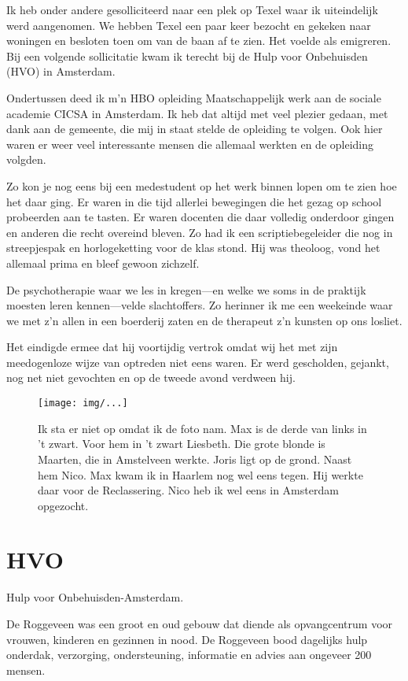 \documentclass[10pt,twoside,openright]{memoir}
\begin{document}
Ik heb onder andere gesolliciteerd naar een plek op Texel waar ik uiteindelijk werd aangenomen. We hebben Texel een paar keer bezocht en gekeken naar woningen en besloten toen om van de baan af te zien. Het voelde als emigreren. Bij een volgende sollicitatie kwam ik terecht bij de Hulp voor Onbehuisden (HVO) in Amsterdam.

Ondertussen deed ik m’n HBO opleiding Maatschappelijk werk aan de sociale academie CICSA in Amsterdam. Ik heb dat altijd met veel plezier gedaan, met dank aan de gemeente, die mij in staat stelde de opleiding te volgen. Ook hier waren er weer veel interessante mensen die allemaal werkten en de opleiding volgden. 

Zo kon je nog eens bij een medestudent op het werk binnen lopen om te zien hoe het daar ging. Er waren in die tijd allerlei bewegingen die het gezag op school probeerden aan te tasten. Er waren docenten die daar volledig onderdoor gingen en anderen die recht overeind bleven. Zo had ik een scriptiebegeleider die nog in streepjespak en horlogeketting voor de klas stond. Hij was theoloog, vond het allemaal prima en bleef gewoon zichzelf. 

De psychotherapie waar we les in kregen---en welke we soms in de praktijk moesten leren kennen---velde slachtoffers. Zo herinner ik me een weekeinde waar we met z’n allen in een boerderij zaten en de therapeut z’n kunsten op ons losliet. 

Het eindigde ermee dat hij voortijdig vertrok omdat wij het met zijn meedogenloze wijze van optreden niet eens waren. Er werd gescholden, gejankt, nog net niet gevochten en op de tweede avond verdween hij.

\begin{figure}[t]
\texttt{[image: img/...]}
\caption{Ik sta er niet op omdat ik de foto nam. Max is de derde van links in ’t zwart. Voor hem in ’t zwart Liesbeth. Die grote blonde is Maarten, die in Amstelveen werkte. Joris ligt op de grond. Naast hem Nico. Max kwam ik in Haarlem nog wel eens tegen. Hij werkte daar voor de Reclassering. Nico heb ik wel eens in Amsterdam opgezocht.}
\end{figure}

\chapter{HVO} %
\label{cha:hvo}

Hulp voor Onbehuisden-Amsterdam.

De Roggeveen was een groot en oud gebouw dat diende als opvangcentrum voor vrouwen, kinderen en gezinnen in nood. De Roggeveen bood dagelijks hulp onderdak, verzorging, ondersteuning, informatie en advies aan ongeveer 200 mensen.
\end{document}
